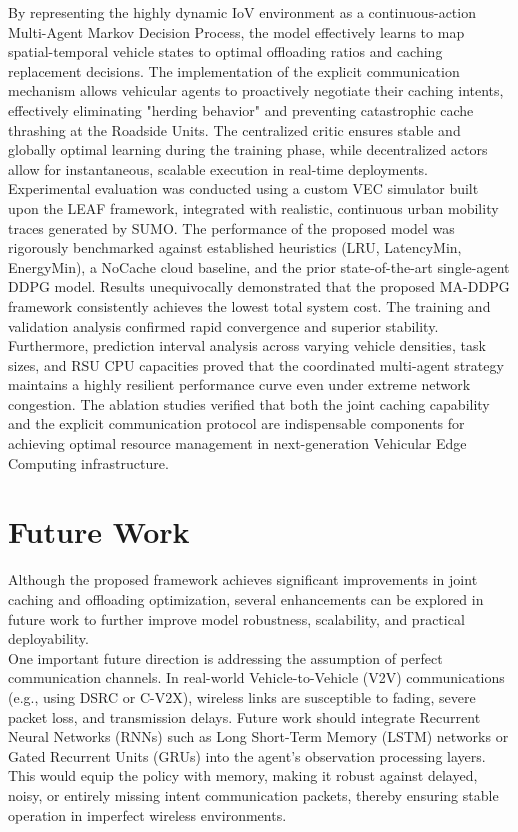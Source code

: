 \documentclass[12pt,a4paper]{report}
\begin{document}
By representing the highly dynamic IoV environment as a continuous-action Multi-Agent Markov Decision Process, the model effectively learns to map spatial-temporal vehicle states to optimal offloading ratios and caching replacement decisions. The implementation of the explicit communication mechanism allows vehicular agents to proactively negotiate their caching intents, effectively eliminating "herding behavior" and preventing catastrophic cache thrashing at the Roadside Units. The centralized critic ensures stable and globally optimal learning during the training phase, while decentralized actors allow for instantaneous, scalable execution in real-time deployments.\\

Experimental evaluation was conducted using a custom VEC simulator built upon the LEAF framework, integrated with realistic, continuous urban mobility traces generated by SUMO. The performance of the proposed model was rigorously benchmarked against established heuristics (LRU, LatencyMin, EnergyMin), a NoCache cloud baseline, and the prior state-of-the-art single-agent DDPG model. Results unequivocally demonstrated that the proposed MA-DDPG framework consistently achieves the lowest total system cost. The training and validation analysis confirmed rapid convergence and superior stability. Furthermore, prediction interval analysis across varying vehicle densities, task sizes, and RSU CPU capacities proved that the coordinated multi-agent strategy maintains a highly resilient performance curve even under extreme network congestion. The ablation studies verified that both the joint caching capability and the explicit communication protocol are indispensable components for achieving optimal resource management in next-generation Vehicular Edge Computing infrastructure.

\section{Future Work}

Although the proposed framework achieves significant improvements in joint caching and offloading optimization, several enhancements can be explored in future work to further improve model robustness, scalability, and practical deployability.\\

One important future direction is addressing the assumption of perfect communication channels. In real-world Vehicle-to-Vehicle (V2V) communications (e.g., using DSRC or C-V2X), wireless links are susceptible to fading, severe packet loss, and transmission delays. Future work should integrate Recurrent Neural Networks (RNNs) such as Long Short-Term Memory (LSTM) networks or Gated Recurrent Units (GRUs) into the agent's observation processing layers. This would equip the policy with memory, making it robust against delayed, noisy, or entirely missing intent communication packets, thereby ensuring stable operation in imperfect wireless environments.\\
\end{document}
